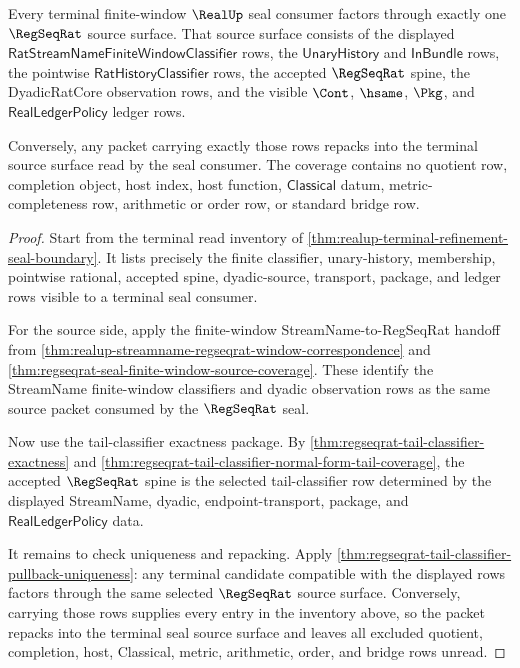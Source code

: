 \begin{theorem}
\label{thm:realup-terminal-regseqrat-source-coverage}
Every terminal finite-window $\RealUp$ seal consumer factors through exactly
one $\RegSeqRat$ source surface. That source surface consists of the displayed
$\mathsf{RatStreamNameFiniteWindowClassifier}$ rows, the
$\mathsf{UnaryHistory}$ and $\mathsf{InBundle}$ rows, the pointwise
$\mathsf{RatHistoryClassifier}$ rows, the accepted $\RegSeqRat$ spine, the
DyadicRatCore observation rows, and the visible $\Cont$, $\hsame$, $\Pkg$, and
$\mathsf{RealLedgerPolicy}$ ledger rows.

Conversely, any packet carrying exactly those rows repacks into the terminal
source surface read by the seal consumer. The coverage contains no quotient
row, completion object, host index, host function, $\mathsf{Classical}$ datum,
metric-completeness row, arithmetic or order row, or standard bridge row.
\end{theorem}
\begin{proof}
Start from the terminal read inventory of
\autoref{thm:realup-terminal-refinement-seal-boundary}. It lists precisely the
finite classifier, unary-history, membership, pointwise rational, accepted
spine, dyadic-source, transport, package, and ledger rows visible to a terminal
seal consumer.

For the source side, apply the finite-window StreamName-to-RegSeqRat handoff
from \autoref{thm:realup-streamname-regseqrat-window-correspondence}
and \autoref{thm:regseqrat-seal-finite-window-source-coverage}. These identify
the StreamName finite-window classifiers and dyadic observation rows as the
same source packet consumed by the $\RegSeqRat$ seal.

Now use the tail-classifier exactness package. By
\autoref{thm:regseqrat-tail-classifier-exactness} and
\autoref{thm:regseqrat-tail-classifier-normal-form-tail-coverage}, the
accepted $\RegSeqRat$ spine is the selected tail-classifier row determined by
the displayed StreamName, dyadic, endpoint-transport, package, and
$\mathsf{RealLedgerPolicy}$ data.

It remains to check uniqueness and repacking. Apply
\autoref{thm:regseqrat-tail-classifier-pullback-uniqueness}: any terminal
candidate compatible with the displayed rows factors through the same selected
$\RegSeqRat$ source surface. Conversely, carrying those rows supplies every
entry in the inventory above, so the packet repacks into the terminal seal
source surface and leaves all excluded quotient, completion, host, Classical,
metric, arithmetic, order, and bridge rows unread.
\end{proof}

